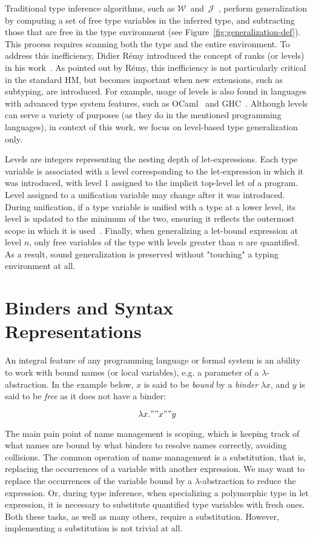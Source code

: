 Traditional type inference algorithms, such as $\mathcal{W}$~and~$\mathcal{J}$~\cite{Milner1978_TypePolymorphism}, perform generalization by computing a set of free type variables in the inferred type, and subtracting those that are free in the type environment (see Figure~\ref{fig:generalization-def}). This process requires scanning both the type and the entire environment. To address this inefficiency, Didier R\'emy introduced the concept of ranks (or levels) in his work~\cite{Remy1992_SortedEqTheoryTypes}. As pointed out by R\'emy, this inefficiency is not particularly critical in the standard HM, but becomes important when new extensions, such as subtyping, are introduced. For example, usage of levels is also found in languages with advanced type system features, such as OCaml~\cite{Kiselyov2022_OCamplTypeChecker} and GHC~\cite{Simon2002_SecretsGHC}. Although levels can serve a variety of purposes (as they do in the mentioned programming languages), in context of this work, we focus on level-based type generalization only.

Levels are integers representing the nesting depth of let-expressions. Each type variable is associated with a level corresponding to the let-expression in which it was introduced, with level 1 assigned to the implicit top-level let of a program. Level assigned to a unification variable may change after it was introduced. During unification, if a type variable is unified with a type at a lower level, its level is updated to the minimum of the two, ensuring it reflects the outermost scope in which it is used~\cite{Kiselyov2022_OCamplTypeChecker}. Finally, when generalizing a let-bound expression at level $n$, only free variables of the type with levels greater than $n$ are quantified. As a result, sound generalization is preserved without "touching" a typing environment at all.

\section{Binders and Syntax Representations}

An integral feature of any programming language or formal system is an ability to work with bound names (or local variables), e.g. a parameter of a $\lambda$-abstraction. In the example below, $x$ is said to be \textit{bound} by a \textit{binder} $\lambda x$, and $y$ is said to be \textit{free} as it does not have a binder:

$$
\lambda x." "x" "y
$$

The main pain point of name management is scoping, which is keeping track of what names are bound by what binders to resolve names correctly, avoiding collisions. The common operation of name management is a substitution, that is, replacing the occurrences of a variable with another expression. We may want to replace the occurrences of the variable bound by a $\lambda$-abstraction to reduce the expression. Or, during type inference, when specializing a polymorphic type in let expression, it is necessary to substitute quantified type variables with fresh ones. Both these tasks, as well as many others, require a substitution. However, implementing a substitution is not trivial at all.

